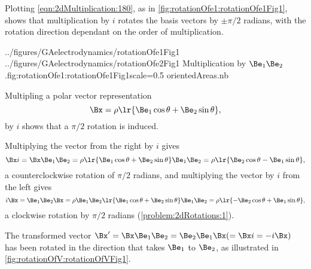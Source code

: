 %
%

Plotting \cref{eqn:2dMultiplication:180}, as in
\cref{fig:rotationOfe1:rotationOfe1Fig1},
 shows that multiplication by \( i \) rotates the  basis vectors by \( \pm \pi/2 \) radians,
with the
rotation direction dependant on the order of multiplication.

\mathImageTwoFigures
{../figures/GAelectrodynamics/rotationOfe1Fig1}
{../figures/GAelectrodynamics/rotationOfe2Fig1}
{Multiplication by \( \Be_1 \Be_2 \).}{fig:rotationOfe1:rotationOfe1Fig1}{scale=0.5}
{orientedAreas.nb}

Multipling a polar vector representation
\begin{equation}\label{eqn:2dRotations:280}
   \Bx = \rho \lr{ \Be_1 \cos\theta + \Be_2 \sin\theta },
\end{equation}
by \( i \) shows that a \( \pi/2 \) rotation is induced.

Multiplying the vector from the right by \( i \) gives
\begin{dmath}\label{eqn:2dRotations:300}
\Bx i
= \Bx \Be_1 \Be_2
= \rho \lr{ \Be_1 \cos\theta + \Be_2 \sin\theta } \Be_1 \Be_2
= \rho \lr{ \Be_2 \cos\theta - \Be_1 \sin\theta },
\end{dmath}
a counterclockwise rotation of \( \pi/2 \) radians, and
multiplying the vector by \( i \) from the left gives
\begin{dmath}\label{eqn:2dRotations:3}
i \Bx
= \Be_1 \Be_2 \Bx
= \rho \Be_1 \Be_2 \lr{ \Be_1 \cos\theta + \Be_2 \sin\theta } \Be_1 \Be_2
= \rho \lr{ -\Be_2 \cos\theta + \Be_1 \sin\theta },
\end{dmath}
a clockwise rotation by \( \pi/2 \) radians
(\cref{problem:2dRotations:1}).

The transformed vector \( \Bx' = \Bx \Be_1 \Be_2 = \Be_2 \Be_1 \Bx (=\Bx i = -i \Bx) \) has been rotated in the direction that takes \( \Be_1 \) to \( \Be_2 \), as illustrated
in \cref{fig:rotationOfV:rotationOfVFig1}.



